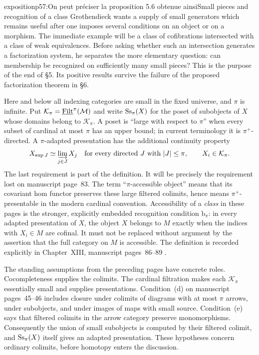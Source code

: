 \begin{dcomment}{exposition}{p57:On peut préciser la proposition 5.6 obtenue ainsi}{Small pieces and recognition of a class}
Grothendieck wants a supply of small generators which remains useful after one imposes several conditions on an object or on a morphism. The immediate example will be a class of cofibrations intersected with a class of weak equivalences. Before asking whether such an intersection generates a factorization system, he separates the more elementary question: can membership be recognized on sufficiently many small pieces? This is the purpose of the end of \S5. Its positive results survive the failure of the proposed factorization theorem in \S6.

Here and below all indexing categories are small in the fixed universe, and $\pi$ is infinite. Put $\mathcal K_\pi=\underline{\mathrm{Filt}}^{\pi}(\mathcal M)$ and write $\mathrm{Ss}_\pi(X)$ for the poset of subobjects of $X$ whose domains belong to $\mathcal K_\pi$. A poset is ``large with respect to $\pi$'' when every subset of cardinal at most $\pi$ has an upper bound; in current terminology it is $\pi^+$-directed. A $\pi$-adapted presentation has the additional continuity property
\[
 X_{\sup J}\simeq\varinjlim_{j\in J}X_j
 \quad\text{for every directed }J\text{ with }|J|\leq\pi,
 \qquad X_i\in\mathcal K_\pi.
\]
The last requirement is part of the definition. It will be precisely the requirement lost on manuscript page~83. The term ``$\pi$-accessible object'' means that its covariant hom functor preserves these large filtered colimits, hence means $\pi^+$-presentable in the modern cardinal convention. Accessibility of a \emph{class} in these pages is the stronger, explicitly embedded recognition condition $\mathrm b_\pi$: in every adapted presentation of $X$, the object $X$ belongs to $M$ exactly when the indices with $X_i\in M$ are cofinal. It must not be replaced without argument by the assertion that the full category on $M$ is accessible. The definition is recorded explicitly in Chapter~XIII, manuscript pages~86--89 \citep{Grothendieck1990XIII}.

The standing assumptions from the preceding pages have concrete roles. Cocompleteness supplies the colimits. The cardinal filtration makes each $\mathcal K_\pi$ essentially small and supplies presentations. Condition~(d) on manuscript pages~45--46 includes closure under colimits of diagrams with at most $\pi$ arrows, under subobjects, and under images of maps with small source. Condition~(e) says that filtered colimits in the arrow category preserve monomorphisms. Consequently the union of small subobjects is computed by their filtered colimit, and $\mathrm{Ss}_\pi(X)$ itself gives an adapted presentation. These hypotheses concern ordinary colimits, before homotopy enters the discussion.


\end{dcomment}
